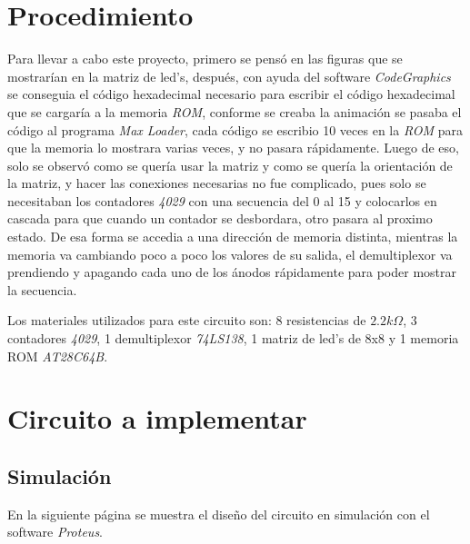 \documentclass[12pt, oneside]{article}
\begin{document}
\section{Procedimiento}
{\sffamily\large
    \hspace{0.5cm} Para llevar a cabo este proyecto, primero se pensó en las figuras que se
    mostrarían en la matriz de led's, después, con ayuda del software \emph{CodeGraphics} se
    conseguia el código hexadecimal necesario para escribir el código hexadecimal que se cargaría
    a la memoria \emph{ROM}, conforme se creaba la animación se pasaba el código al programa
    \emph{Max Loader}, cada código se escribio 10 veces en la \emph{ROM} para que la memoria lo
    mostrara varias veces, y no pasara rápidamente. Luego de eso, solo se observó como se quería
    usar la matriz y como se quería la orientación de la matriz, y hacer las conexiones necesarias
    no fue complicado, pues solo se necesitaban los contadores \emph{4029} con una secuencia del 0
    al 15 y colocarlos en cascada para que cuando un contador se desbordara, otro pasara al
    proximo estado. De esa forma se accedia a una dirección de memoria distinta, mientras la
    memoria va cambiando poco a poco los valores de su salida, el demultiplexor va prendiendo y
    apagando cada uno de los ánodos rápidamente para poder mostrar la secuencia.

    \hspace{0.5cm} Los materiales utilizados para este circuito son: 8 resistencias de
    $2.2k\Omega$, 3 contadores \emph{4029}, 1 demultiplexor \emph{74LS138}, 1 matriz de led's
    de 8x8 y 1 memoria ROM \emph{AT28C64B}.

}

\section{Circuito a implementar}
\subsection{Simulación}
{\sffamily\large
    \hspace{0.5cm} En la siguiente página se muestra el diseño del circuito en simulación con el
    software \emph{Proteus\textregistered}.

    \newpage
    

}
\end{document}

